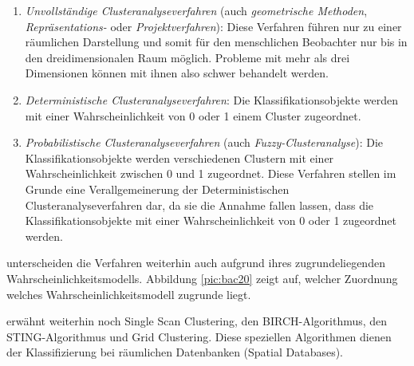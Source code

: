 \begin{enumerate}
	\item \textit{Unvollständige Clusteranalyseverfahren} (auch \textit{geometrische Methoden}, \textit{Repräsentations-} oder \textit{Projektverfahren}): Diese Verfahren führen nur zu einer räumlichen Darstellung und somit für den menschlichen Beobachter nur bis in den dreidimensionalen Raum möglich. Probleme mit mehr als drei Dimensionen können mit ihnen also schwer behandelt werden.
	\item \textit{Deterministische Clusteranalyseverfahren}: Die Klassifikationsobjekte werden mit einer Wahrscheinlichkeit von 0 oder 1 einem Cluster zugeordnet. 
	\item \textit{Probabilistische Clusteranalyseverfahren} (auch \textit{Fuzzy-Clusteranalyse}): Die Klassifikationsobjekte werden verschiedenen Clustern mit einer Wahrscheinlichkeit zwischen 0 und 1 zugeordnet. Diese Verfahren stellen im Grunde eine Verallgemeinerung der Deterministischen Clusteranalyseverfahren dar, da sie die Annahme fallen lassen, dass die Klassifikationsobjekte mit einer Wahrscheinlichkeit von 0 oder 1 zugeordnet werden.
\end{enumerate}

\citet[S. 21]{Bacher.2010} unterscheiden die Verfahren weiterhin auch aufgrund ihres zugrundeliegenden Wahrscheinlichkeitsmodells. Abbildung \ref{pic:bac20} zeigt auf, welcher Zuordnung welches Wahrscheinlichkeitsmodell zugrunde liegt. 

\citet{Xu.1999} erwähnt weiterhin noch Single Scan Clustering, den BIRCH-Algorithmus, den STING-Algorithmus und Grid Clustering. Diese speziellen Algorithmen dienen der Klassifizierung bei räumlichen Datenbanken (Spatial Databases).